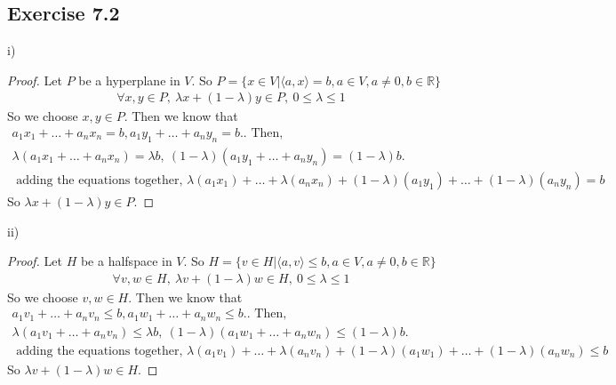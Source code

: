\documentclass[11.5pt, letterpaper, bibtotoc,
    tablecaptionabove, figurecaptionabove]{article}
\begin{document}
\subsection*{Exercise 7.2}
i) 
\begin{proof}
	Let $P$ be a hyperplane in $V$.  So $P=\{ x \in V | \langle a, x \rangle = b, a \in V, a\neq 0, b \in \mathbb R \}$
	\begin{align*}
		\forall x, y \in P, \: \lambda x + (1 - \lambda)y \in P,\: 0 \leq \lambda \leq 1
	\end{align*}
	So we choose $x, y \in P$.  Then we know that
	\begin{align*}
		a_1 x_1 + \dots + a_n x_n = b, a_1 y_1 + \dots + a_n y_n = b.  \text{. Then, } \\
		\lambda(a_1 x_1 + \dots + a_n x_n) = \lambda b , \:(1- \lambda)(a_1 y_1 + \dots + a_n y_n) = (1 - \lambda)b.\\
		\text{ adding the equations together, } \lambda(a_1 x_1) + \dots + \lambda(a_n x_n) +(1- \lambda)(a_1 y_1) + \dots + (1- \lambda)(a_n y_n) = b
	\end{align*}
	So $\lambda x + (1 - \lambda)y \in P$.
\end{proof}
ii) 
\begin{proof}
	Let $H$ be a halfspace in $V$.  So $H=\{ v \in H | \langle a, v \rangle \leq b, a \in V, a\neq 0, b \in \mathbb R \}$
	\begin{align*}
		\forall v, w \in H, \: \lambda v + (1 - \lambda)w \in H,\: 0 \leq \lambda \leq 1
	\end{align*}
	So we choose $v, w \in H$.  Then we know that
	\begin{align*}
		a_1 v_1 + \dots + a_n v_n \leq b, a_1 w_1 + \dots + a_n w_n \leq b.  \text{. Then, } \\
		\lambda(a_1 v_1 + \dots + a_n v_n) \leq \lambda b , \:(1- \lambda)(a_1 w_1 + \dots + a_n w_n) \leq (1 - \lambda)b.\\
		\text{ adding the equations together, } \lambda(a_1 v_1) + \dots + \lambda(a_n v_n) +(1- \lambda)(a_1 w_1) + \dots + (1- \lambda)(a_n w_n) \leq b
	\end{align*}
	So $\lambda v + (1 - \lambda)w \in H$.
\end{proof}
\end{document}
